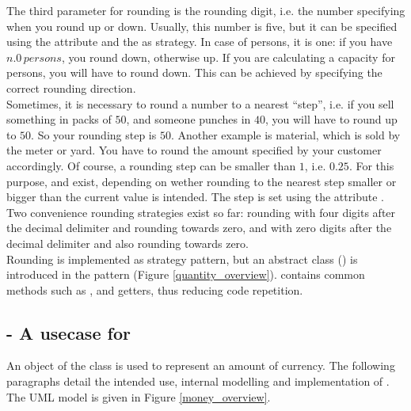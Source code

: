 The third parameter for rounding is the rounding digit, i.e. the number specifying when you round up or down.
Usually, this number is five, but it can be specified using the attribute  and the  as strategy.
In case of persons, it is one: if you have $n.0\,persons$, you round down, otherwise up.
If you are calculating a capacity for persons, you will have to round down.
This can be achieved by specifying the correct rounding direction.
\\

Sometimes, it is necessary to round a number to a nearest ``step'', i.e. if you sell something in packs of $50$, and someone punches in $40$, you will have to round up to $50$.
So your rounding step is $50$.
Another example is material, which is sold by the meter or yard.
You have to round the amount specified by your customer accordingly.
Of course, a rounding step can be smaller than $1$, i.e. $0.25$.
For this purpose,  and  exist, depending on wether rounding to the nearest step smaller or bigger than the current value is intended.
The step is set using the attribute .
\\

Two convenience rounding strategies exist so far:  rounding with four digits after the decimal delimiter and rounding towards zero, and  with zero digits after the decimal delimiter and also rounding towards zero.
\\

Rounding is implemented as strategy pattern, but an abstract class () is introduced in the pattern (Figure \ref{quantity_overview}).
 contains common methods such as ,  and getters, thus reducing code repetition.
\subsection{ - A usecase for }
An object of the class  is used to represent an amount of currency.
The following paragraphs detail the intended use, internal modelling and implementation of .
The UML model is given in Figure \ref{money_overview}.


